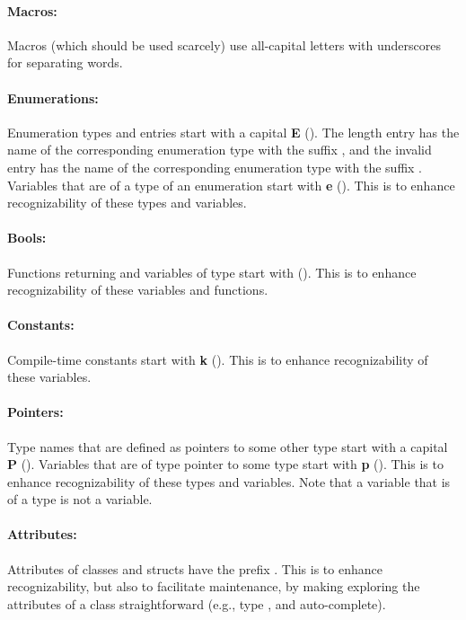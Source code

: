\documentclass[footinclude=false,11pt,DIV11]{scrartcl}
\begin{document}
\paragraph{Macros:} Macros (which should be used scarcely) use all-capital letters
with underscores for separating words.

\paragraph{Enumerations:} Enumeration types and entries start with a capital
\textbf{E} (\Etype). The length entry has the name of the corresponding enumeration
type with the suffix , and the invalid entry has the name of the
corresponding enumeration type with the suffix . Variables that are of a
type of an enumeration start with \textbf{e} (\etype). This is to enhance
recognizability of these types and variables.

\paragraph{Bools:} Functions returning  and variables of type 
start with  (\btype). This is to enhance recognizability of these variables
and functions.

\paragraph{Constants:} Compile-time constants start with \textbf{k} (\ktype). This is
to enhance recognizability of these variables.

\paragraph{Pointers:} Type names that are defined as pointers to some other type start
with a capital \textbf{P} (\Ptype). Variables that are of type pointer to some
type start with \textbf{p} (\ptype). This is to enhance recognizability of these types
and variables. Note that a variable that is of a \Ptype type is not a \ptype variable.

\paragraph{Attributes:} Attributes of classes and structs have the prefix .
This is to enhance recognizability, but also to facilitate maintenance, by making
exploring the attributes of a class straightforward (e.g., type , and
auto-complete).
\end{document}
